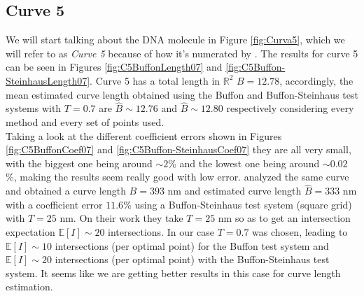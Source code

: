 \subsection{Curve 5}
We will start talking about the DNA molecule in Figure \ref{fig:Curva5}, which we will refer to as \textit{Curve 5} because of how it's numerated by \cite{adn.pdf}. The results for curve 5 can be seen in Figures \ref{fig:C5BuffonLength07} and \ref{fig:C5Buffon-SteinhausLength07}. Curve 5 has a total length in $\mathbb{R}^2$ $B=12.78$, accordingly, the mean estimated curve length obtained using the Buffon and Buffon-Steinhaus test systems with $T=0.7$ are $\widehat{B} \sim 12.76$ and $\widehat{B} \sim 12.80$ respectively considering every method and every set of points used.\\




Taking a look at the different coefficient errors shown in Figures \ref{fig:C5BuffonCoef07} and \ref{fig:C5Buffon-SteinhausCoef07} they are all very small, with the biggest one being around $\sim 2$\% and the lowest one being around $\sim 0.02$\%, making the results seem really good with low error. \cite{adn.pdf} analyzed the same curve and obtained a curve length $B=393$ nm and estimated curve length $\widehat{B}=333$ nm with a coefficient error $11.6$\% using a Buffon-Steinhaus test system (square grid) with $T=25$ nm. On their work they take $T=25$ nm so as to get an intersection expectation $\mathbb{E}[I] \sim 20$ intersections. In our case $T=0.7$ was chosen, leading to $\mathbb{E}[I] \sim 10$ intersections (per optimal point) for the Buffon test system and $\mathbb{E}[I] \sim 20$ intersections (per optimal point) with the Buffon-Steinhaus test system. It seems like we are getting better results in this case for curve length estimation.\\



